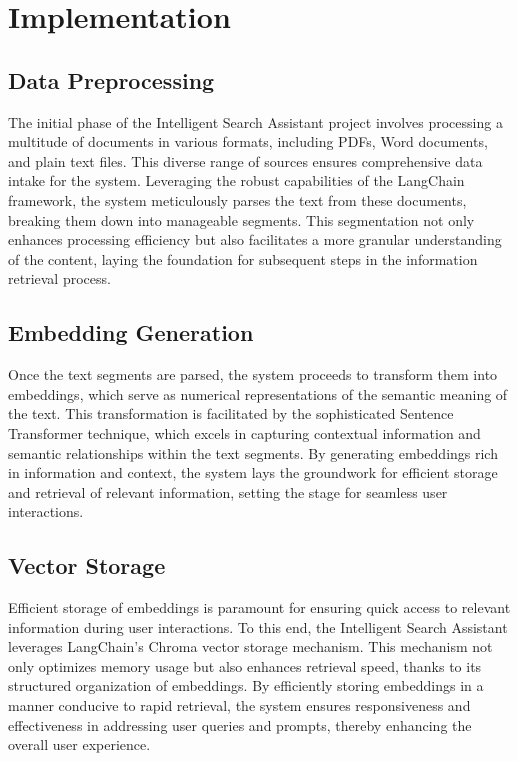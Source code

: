 \documentclass[12pt,a4paper,oneside]{report}
\begin{document}
\newpage
\chapter{Implementation}
\section{Data Preprocessing}
\par The initial phase of the Intelligent Search Assistant project involves processing a multitude of documents in various formats, including PDFs, Word documents, and plain text files. This diverse range of sources ensures comprehensive data intake for the system. Leveraging the robust capabilities of the LangChain framework, the system meticulously parses the text from these documents, breaking them down into manageable segments. This segmentation not only enhances processing efficiency but also facilitates a more granular understanding of the content, laying the foundation for subsequent steps in the information retrieval process.

\section{Embedding Generation}
\par Once the text segments are parsed, the system proceeds to transform them into embeddings, which serve as numerical representations of the semantic meaning of the text. This transformation is facilitated by the sophisticated Sentence Transformer technique, which excels in capturing contextual information and semantic relationships within the text segments. By generating embeddings rich in information and context, the system lays the groundwork for efficient storage and retrieval of relevant information, setting the stage for seamless user interactions.

\section{Vector Storage}
\par Efficient storage of embeddings is paramount for ensuring quick access to relevant information during user interactions. To this end, the Intelligent Search Assistant leverages LangChain's Chroma vector storage mechanism. This mechanism not only optimizes memory usage but also enhances retrieval speed, thanks to its structured organization of embeddings. By efficiently storing embeddings in a manner conducive to rapid retrieval, the system ensures responsiveness and effectiveness in addressing user queries and prompts, thereby enhancing the overall user experience.
\end{document}
